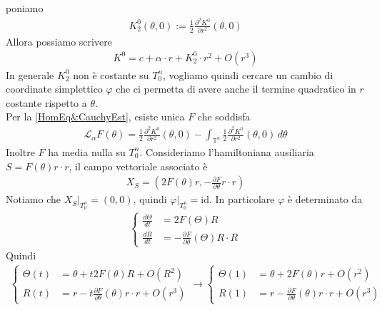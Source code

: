 \documentclass[twoside, 11pt]{amsbook}
\makeatletter
\newcommand{\0}{{(0)}}
\newcommand{\3}{{(3)}}
\theoremstyle{colonplain}
\theoremstyle{colondefinition}
\theoremstyle{colonremark}
\numberwithin{equation}{chapter}
\renewcommand{\proofname}{Dimostrazione}
\renewenvironment{proof}[1][\proofname]{\par
  \pushQED{\qed}%
  \normalfont \topsep6\p@\@plus6\p@\relax
  \trivlist
  \item[\hskip\labelsep\bfseries #1:]\ignorespaces
}{%
  \popQED\endtrivlist\@endpefalse
}
\makeatother
\begin{document}
\begin{proof} poniamo
\begin{align}
    K^0_2(\theta, 0) := \frac{1}{2}\frac{\partial^2 K^0}{\partial r^2}(\theta, 0) 
\end{align}
Allora possiamo scrivere
\begin{align}\label{SecOrdExpK0}
    K^0 = c + \alpha \cdot r + K^0_2 \cdot r^2 + O(r^3) 
\end{align}
In generale $K^0_2$ non è costante su $T^n_0$, vogliamo quindi cercare un cambio di coordinate simplettico $\varphi$ che ci permetta di avere anche il termine quadratico in $r$ costante rispetto a $\theta$. \\
Per la \ref{HomEq&CauchyEst}, esiste unica $F$ che soddisfa
\begin{align}
    \mathcal{L}_\alpha F(\theta) = \frac{1}{2}\frac{\partial^2 K^0}{\partial r^2}(\theta, 0) - \int_{\mathbb{T}^n} \frac{1}{2}\frac{\partial^2 K^0}{\partial r^2}(\theta, 0) \, d\theta 
\end{align}
Inoltre $F$ ha media nulla su $T^n_0$. Consideriamo l'hamiltoniana ausiliaria $S = F(\theta)r \cdot r$, il campo vettoriale associato è
\begin{align}
    X_S = \left(2F(\theta)r,-\frac{\partial F}{\partial \theta}r \cdot r\right) 
\end{align}
Notiamo che $X_S|_{T^n_0} = (0, 0)$, quindi $\varphi|_{T^n_0} = \mathrm{id}$. In particolare $\varphi$ è determinato da
\begin{align}
    \begin{cases}
        \frac{d\Theta}{dt} &= 2F(\Theta)R \\
        \frac{dR}{dt} &= -\frac{\partial F}{\partial \theta}(\Theta)R \cdot R
    \end{cases} 
\end{align}
Quindi
\begin{align}\label{Time1AusFlow}
    \begin{cases}
        \Theta(t) &= \theta + t2F(\theta)R + O(R^2) \\
        R(t) &= r - t\frac{\partial F}{\partial \theta}(\theta)r \cdot r + O(r^3)
    \end{cases} \rightarrow \begin{cases}
        \Theta(1) &= \theta + 2F(\theta)r + O(r^2) \\
        R(1) &= r - \frac{\partial F}{\partial \theta}(\theta)r \cdot r + O(r^3)
    \end{cases} 
\end{align}

\end{proof}
\end{document}

